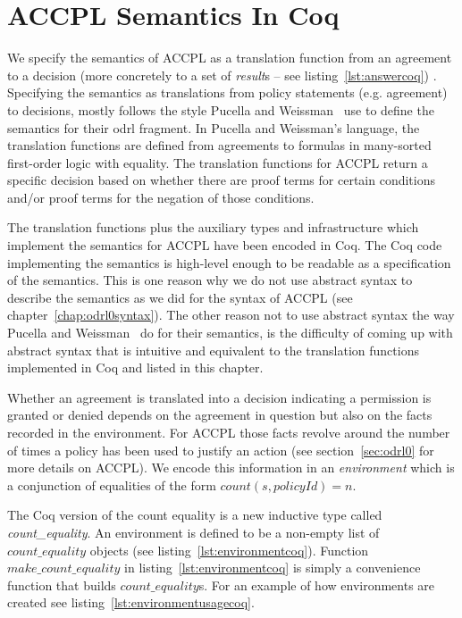 \chapter{ACCPL Semantics In Coq}\label{chap:accplsemanticscoq}

We specify the semantics of \ac{ACCPL} as a translation function from an agreement to a decision (more concretely to a set of \emph{result}s -- see listing~\ref{lst:answercoq}) . Specifying the semantics as translations from policy statements (e.g. agreement) to decisions, mostly follows the style Pucella and Weissman~\cite{pucella2006} use to define the semantics for their \ac{odrl} fragment. In Pucella and Weissman's language, the translation functions are defined from agreements to formulas in many-sorted first-order logic with equality. The translation functions for \ac{ACCPL} return a specific decision based on whether there are proof terms for certain conditions and/or proof terms for the negation of those conditions. 
 

The translation functions plus the auxiliary types and infrastructure which implement the semantics for \ac{ACCPL} have been encoded in Coq. The Coq code implementing the semantics is high-level enough to be readable as a specification of the semantics. This is one reason why we do not use abstract syntax to describe the semantics as we did for the syntax of \ac{ACCPL} (see chapter~\ref{chap:odrl0syntax}). The other reason not to use abstract syntax the way Pucella and Weissman~\cite{pucella2006} do for their semantics, is the difficulty of coming up with abstract syntax that is intuitive and equivalent to the translation functions implemented in Coq and listed in this chapter.

Whether an agreement is translated into a decision indicating a permission is granted or denied depends on the agreement in question but also on the facts recorded in the environment. For \ac{ACCPL} those facts revolve around the number of times a policy has been used to justify an action (see section~\ref{sec:odrl0} for more details on \ac{ACCPL}). We encode this information in an \emph{environment} which is a conjunction of equalities of the form $count(s, policyId) = n$. 

The Coq version of the count equality is a new inductive type called \emph{count\_equality}. An environment is defined to be a non-empty list of $count\_equality$ objects (see listing~\ref{lst:environmentcoq}). Function $make\_count\_equality$ in listing~\ref{lst:environmentcoq} is simply a convenience function that builds $count\_equality$s. For an example of how environments are created see listing~\ref{lst:environmentusagecoq}.

